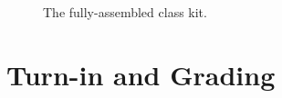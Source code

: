     \begin{figure}
        \centering

        \caption{The fully-assembled class kit.\label{fig:complete}}
    \end{figure}

\section{Turn-in and Grading}

